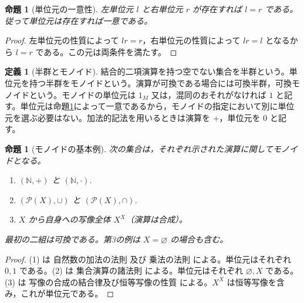 \documentclass[a5paper,10pt,dvipdfmx]{jsarticle}
\theoremstyle{definition}
\newtheorem{defn}[ruledef]{定義}
\theoremstyle{plain}
\newtheorem{prop}[ruledef]{命題}
\newcommand{\Pow}{\mathcal{P}}
\newcommand{\GenronRefText}[2]{#2}
\begin{document}
\begin{prop}[単位元の一意性]\label{k162}
左単位元 $l$ と右単位元 $r$ が存在すれば $l=r$ である。従って単位元は存在すれば一意である。
\end{prop}
\begin{proof}
左単位元の性質によって $lr=r$，右単位元の性質によって $lr=l$ となるから $l=r$ である。この元は両条件を満たす。
\end{proof}
\begin{defn}[半群とモノイド]\label{k163}
結合的二項演算を持つ空でない集合を半群という。単位元を持つ半群をモノイドという。演算が可換である場合には可換半群，可換モノイドという。モノイドの単位元は $1_M$ 又は，混同のおそれがなければ $1$ と記す。単位元は命題\ref{k162}によって一意であるから，モノイドの指定において別に単位元を選ぶ必要はない。加法的記法を用いるときは演算を $+$，単位元を $0$ と記す。
\end{defn}
\begin{prop}[モノイドの基本例]\label{k164}
次の集合は，それぞれ示された演算に関してモノイドとなる。
\begin{enumerate}
\item $(\mathbb N,+)$ と $(\mathbb N,\cdot)$.
\item $(\Pow(X),\cup)$ と $(\Pow(X),\cap)$.
\item $X$ から自身への写像全体 $X^X$（演算は合成）。
\end{enumerate}
最初の二組は可換である。第3の例は $X=\varnothing$ の場合も含む。
\end{prop}
\begin{proof}
(1) は \GenronRefText{K-000108}{自然数の加法の法則} 及び \GenronRefText{K-000109}{乗法の法則} による。単位元はそれぞれ $0,1$ である。(2) は \GenronRefText{K-000030}{集合演算の諸法則} による。単位元はそれぞれ $\varnothing,X$ である。(3) は \GenronRefText{K-000036}{写像の合成の結合律及び恒等写像の性質} による。$X^X$ は恒等写像を含み，これが単位元である。
\end{proof}
\end{document}

